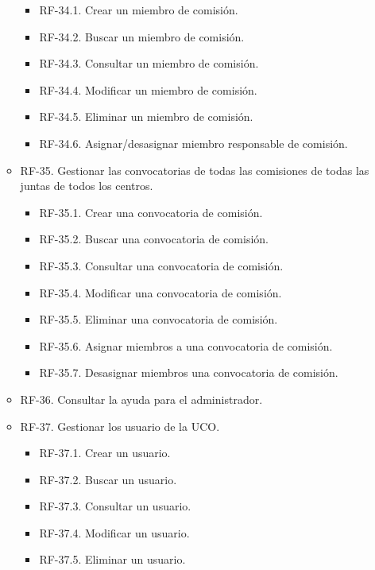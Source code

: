 \begin{itemize}
\begin{itemize}
             \begin{itemize}
                  \item RF-34.1. Crear un miembro de comisión.
                  \item RF-34.2. Buscar un miembro de comisión.
                  \item RF-34.3. Consultar un miembro de comisión.
                  \item RF-34.4. Modificar un miembro de comisión.
                  \item RF-34.5. Eliminar un miembro de comisión.
                  \item RF-34.6. Asignar/desasignar miembro responsable de comisión.
             \end{itemize} 
        \item RF-35. Gestionar las convocatorias de todas las comisiones de todas las juntas de todos los centros.
             \begin{itemize}
                  \item RF-35.1. Crear una convocatoria de comisión.
                  \item RF-35.2. Buscar una convocatoria de comisión.
                  \item RF-35.3. Consultar una convocatoria de comisión.
                  \item RF-35.4. Modificar una convocatoria de comisión.
                  \item RF-35.5. Eliminar una convocatoria de comisión.
                  \item RF-35.6. Asignar miembros a una convocatoria de comisión.
                  \item RF-35.7. Desasignar miembros una convocatoria de comisión.
             \end{itemize}
         \item RF-36. Consultar la ayuda para el administrador.
         \item RF-37. Gestionar los usuario de la UCO.
             \begin{itemize}
                  \item RF-37.1. Crear un usuario.
                  \item RF-37.2. Buscar un usuario.
                  \item RF-37.3. Consultar un usuario.
                  \item RF-37.4. Modificar un usuario.
                  \item RF-37.5. Eliminar un usuario.
             \end{itemize} 
     \end{itemize}
 \end{itemize}

